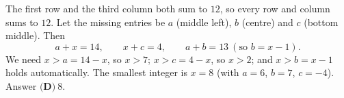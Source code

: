The first row and the third column both sum to $12$, so every row and column sums to $12$. Let the missing entries be $a$ (middle left), $b$ (centre) and $c$ (bottom middle). Then
\[a+x=14,\qquad x+c=4,\qquad a+b=13\ (\text{so } b=x-1).\]
We need $x>a=14-x$, so $x>7$; $x>c=4-x$, so $x>2$; and $x>b=x-1$ holds automatically. The smallest integer is $x=8$ (with $a=6$, $b=7$, $c=-4$). Answer $\boxed{\textbf{(D)}\ 8}$.
